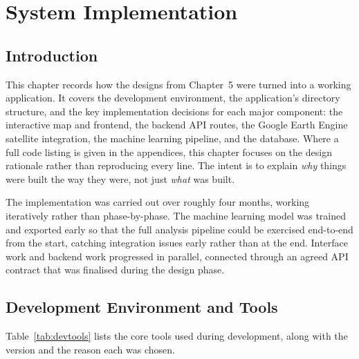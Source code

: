 \chapter{System Implementation}

\section{Introduction}

This chapter records how the designs from Chapter~5 were turned into a working application. It covers the development environment, the application's directory structure, and the key implementation decisions for each major component: the interactive map and frontend, the backend API routes, the Google Earth Engine satellite integration, the machine learning pipeline, and the database. Where a full code listing is given in the appendices, this chapter focuses on the design rationale rather than reproducing every line. The intent is to explain \emph{why} things were built the way they were, not just \emph{what} was built.

The implementation was carried out over roughly four months, working iteratively rather than phase-by-phase. The machine learning model was trained and exported early so that the full analysis pipeline could be exercised end-to-end from the start, catching integration issues early rather than at the end. Interface work and backend work progressed in parallel, connected through an agreed API contract that was finalised during the design phase.

\section{Development Environment and Tools}

Table~\ref{tab:devtools} lists the core tools used during development, along with the version and the reason each was chosen.


